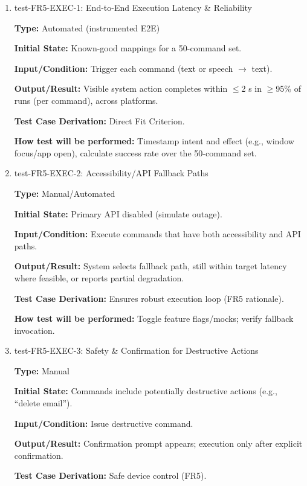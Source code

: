 \documentclass[12pt, titlepage]{article}
\begin{document}
\begin{enumerate}

\item{test-FR5-EXEC-1: End-to-End Execution Latency \& Reliability\\}

\textbf{Type:} Automated (instrumented E2E)

\textbf{Initial State:} Known-good mappings for a 50-command set.

\textbf{Input/Condition:} Trigger each command (text or speech $\rightarrow$ text).

\textbf{Output/Result:} Visible system action completes within $\leq$2 s in $\geq$95\% of runs (per command), across platforms.

\textbf{Test Case Derivation:} Direct Fit Criterion.

\textbf{How test will be performed:} Timestamp intent and effect (e.g., window focus/app open), calculate success rate over the 50-command set.

\item{test-FR5-EXEC-2: Accessibility/API Fallback Paths\\}

\textbf{Type:} Manual/Automated

\textbf{Initial State:} Primary API disabled (simulate outage).

\textbf{Input/Condition:} Execute commands that have both accessibility and API paths.

\textbf{Output/Result:} System selects fallback path, still within target latency where feasible, or reports partial degradation.

\textbf{Test Case Derivation:} Ensures robust execution loop (FR5 rationale).

\textbf{How test will be performed:} Toggle feature flags/mocks; verify fallback invocation.

\item{test-FR5-EXEC-3: Safety \& Confirmation for Destructive Actions\\}

\textbf{Type:} Manual

\textbf{Initial State:} Commands include potentially destructive actions (e.g., “delete email”).

\textbf{Input/Condition:} Issue destructive command.

\textbf{Output/Result:} Confirmation prompt appears; execution only after explicit confirmation.

\textbf{Test Case Derivation:} Safe device control (FR5).


\end{enumerate}
\end{document}
